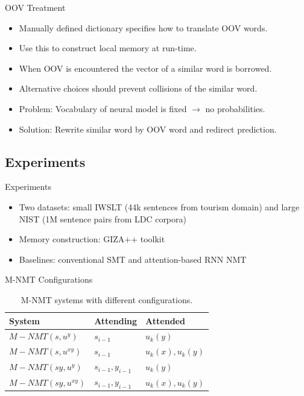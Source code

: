 \documentclass{beamer}
\begin{document}
\begin{frame}{OOV Treatment}
\begin{itemize}
\item Manually defined dictionary specifies how to translate OOV words.
\item Use this to construct local memory at run-time.
\item When OOV is encountered the vector of a similar word is borrowed.
\item Alternative choices should prevent collisions of the similar word.
\item Problem: Vocabulary of neural model is fixed  $\rightarrow$ no probabilities.
\item Solution: Rewrite similar word by OOV word and redirect prediction. 
\end{itemize}
\end{frame}

\subsection{Experiments}
\begin{frame}{Experiments}
\begin{itemize}
\item Two datasets: small IWSLT (44k sentences from tourism domain) and large NIST (1M sentence pairs from LDC corpora)
\item Memory construction: GIZA++ toolkit
\item Baselines: conventional SMT and attention-based RNN NMT
\end{itemize}
\end{frame}

\begin{frame}{M-NMT Configurations}
\begin{table}
\centering
\begin{tabular}{|l|l|l|}
\hline
System & Attending & Attended \\
\hline
$M-NMT(s,u^y)$ & $s_{i-1}$ & $u_k(y)$ \\
$M-NMT(s,u^{xy})$ & $s_{i-1}$ & $u_k(x),u_k(y)$ \\
$M-NMT(sy,u^y)$ & $s_{i-1},y_{i-1}$ & $u_k(y)$ \\
$M-NMT(sy,u^{xy})$ & $s_{i-1},y_{i-1}$ & $u_k(x),u_k(y)$ \\
\hline
\end{tabular}
\caption{M-NMT systems with different configurations.}
\end{table}
\end{frame}
\end{document}

